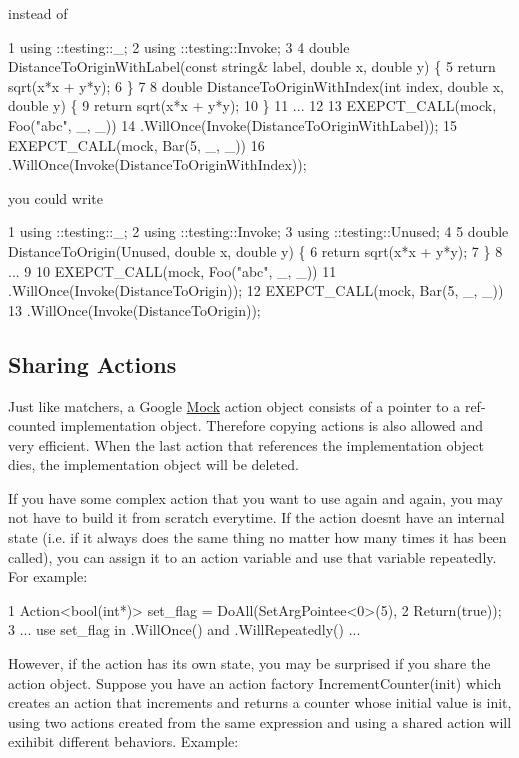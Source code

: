 instead of


\begin{DoxyCode}
1 using ::testing::\_;
2 using ::testing::Invoke;
3 
4 double DistanceToOriginWithLabel(const string& label, double x, double y) \{
5   return sqrt(x*x + y*y);
6 \}
7 
8 double DistanceToOriginWithIndex(int index, double x, double y) \{
9   return sqrt(x*x + y*y);
10 \}
11 ...
12 
13   EXEPCT\_CALL(mock, Foo("abc", \_, \_))
14       .WillOnce(Invoke(DistanceToOriginWithLabel));
15   EXEPCT\_CALL(mock, Bar(5, \_, \_))
16       .WillOnce(Invoke(DistanceToOriginWithIndex));
\end{DoxyCode}


you could write


\begin{DoxyCode}
1 using ::testing::\_;
2 using ::testing::Invoke;
3 using ::testing::Unused;
4 
5 double DistanceToOrigin(Unused, double x, double y) \{
6   return sqrt(x*x + y*y);
7 \}
8 ...
9 
10   EXEPCT\_CALL(mock, Foo("abc", \_, \_))
11       .WillOnce(Invoke(DistanceToOrigin));
12   EXEPCT\_CALL(mock, Bar(5, \_, \_))
13       .WillOnce(Invoke(DistanceToOrigin));
\end{DoxyCode}


\subsection*{Sharing Actions}

Just like matchers, a Google \hyperlink{class_mock}{Mock} action object consists of a pointer to a ref-\/counted implementation object. Therefore copying actions is also allowed and very efficient. When the last action that references the implementation object dies, the implementation object will be deleted.

If you have some complex action that you want to use again and again, you may not have to build it from scratch everytime. If the action doesn\textquotesingle{}t have an internal state (i.\+e. if it always does the same thing no matter how many times it has been called), you can assign it to an action variable and use that variable repeatedly. For example\+:


\begin{DoxyCode}
1 Action<bool(int*)> set\_flag = DoAll(SetArgPointee<0>(5),
2                                     Return(true));
3 ... use set\_flag in .WillOnce() and .WillRepeatedly() ...
\end{DoxyCode}


However, if the action has its own state, you may be surprised if you share the action object. Suppose you have an action factory {\ttfamily Increment\+Counter(init)} which creates an action that increments and returns a counter whose initial value is {\ttfamily init}, using two actions created from the same expression and using a shared action will exihibit different behaviors. Example\+:


